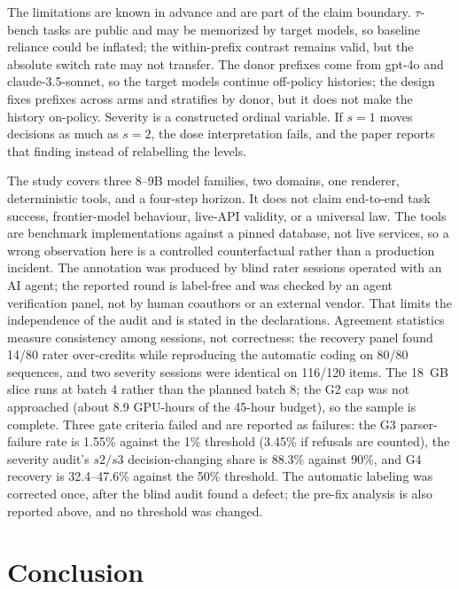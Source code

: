 \documentclass[a4paper,fleqn]{cas-sc}
\begin{document}
The limitations are known in advance and are part of the claim boundary. $\tau$-bench tasks are
public and may be memorized by target models, so baseline reliance could be inflated; the
within-prefix contrast remains valid, but the absolute switch rate may not transfer. The donor
prefixes come from gpt-4o and claude-3.5-sonnet, so the target models continue off-policy
histories; the design fixes prefixes across arms and stratifies by donor, but it does not make the
history on-policy. Severity is a constructed ordinal variable. If $s=1$ moves decisions as much as
$s=2$, the dose interpretation fails, and the paper reports that finding instead of relabelling
the levels.

The study covers three 8--9B model families, two domains, one renderer, deterministic tools, and a
four-step horizon. It does not claim end-to-end task success, frontier-model behaviour, live-API
validity, or a universal law. The tools are benchmark implementations against a pinned database,
not live services, so a wrong observation here is a controlled counterfactual rather than a
production incident. The annotation was produced by blind rater sessions operated with an AI
agent; the reported round is label-free and was checked by an agent verification panel, not by
human coauthors or an external vendor. That limits the independence of the audit and is stated in
the declarations. Agreement statistics measure consistency among sessions, not correctness: the
recovery panel found 14/80 rater over-credits while reproducing the automatic coding on 80/80
sequences, and two severity sessions were identical on 116/120 items. The 18~GB slice runs at
batch 4 rather than the planned batch 8; the G2 cap was not approached (about 8.9 GPU-hours of the
45-hour budget), so the sample is complete. Three gate criteria failed and are reported as
failures: the G3 parser-failure rate is 1.55\% against the 1\% threshold (3.45\% if refusals are
counted), the severity audit's $s2/s3$ decision-changing share is 88.3\% against 90\%, and G4
recovery is 32.4--47.6\% against the 50\% threshold. The automatic labeling was
corrected once, after the blind audit found a defect; the pre-fix analysis is also reported
above, and no threshold was changed.

\section{Conclusion}\label{sec:conclusion}
\end{document}
